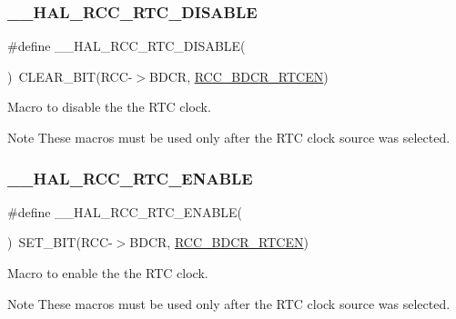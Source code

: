 \subsubsection{\texorpdfstring{\+\_\+\+\_\+\+H\+A\+L\+\_\+\+R\+C\+C\+\_\+\+R\+T\+C\+\_\+\+D\+I\+S\+A\+B\+LE}{\_\_HAL\_RCC\_RTC\_DISABLE}}
{\footnotesize\ttfamily \#define \+\_\+\+\_\+\+H\+A\+L\+\_\+\+R\+C\+C\+\_\+\+R\+T\+C\+\_\+\+D\+I\+S\+A\+B\+LE(\begin{DoxyParamCaption}{ }\end{DoxyParamCaption})~C\+L\+E\+A\+R\+\_\+\+B\+IT(R\+CC-\/$>$B\+D\+CR, \hyperlink{group___peripheral___registers___bits___definition_ga79ea6f2df75f09b17df9582037ed6a53}{R\+C\+C\+\_\+\+B\+D\+C\+R\+\_\+\+R\+T\+C\+EN})}



Macro to disable the the R\+TC clock. 

\begin{DoxyNote}{Note}
These macros must be used only after the R\+TC clock source was selected. 
\end{DoxyNote}
\mbox{\label{group___r_c_c___r_t_c___clock___configuration_gab7cc36427c31da645a0e38e181f8ce0f}} 
\subsubsection{\texorpdfstring{\+\_\+\+\_\+\+H\+A\+L\+\_\+\+R\+C\+C\+\_\+\+R\+T\+C\+\_\+\+E\+N\+A\+B\+LE}{\_\_HAL\_RCC\_RTC\_ENABLE}}
{\footnotesize\ttfamily \#define \+\_\+\+\_\+\+H\+A\+L\+\_\+\+R\+C\+C\+\_\+\+R\+T\+C\+\_\+\+E\+N\+A\+B\+LE(\begin{DoxyParamCaption}{ }\end{DoxyParamCaption})~S\+E\+T\+\_\+\+B\+IT(R\+CC-\/$>$B\+D\+CR, \hyperlink{group___peripheral___registers___bits___definition_ga79ea6f2df75f09b17df9582037ed6a53}{R\+C\+C\+\_\+\+B\+D\+C\+R\+\_\+\+R\+T\+C\+EN})}



Macro to enable the the R\+TC clock. 

\begin{DoxyNote}{Note}
These macros must be used only after the R\+TC clock source was selected. 
\end{DoxyNote}
